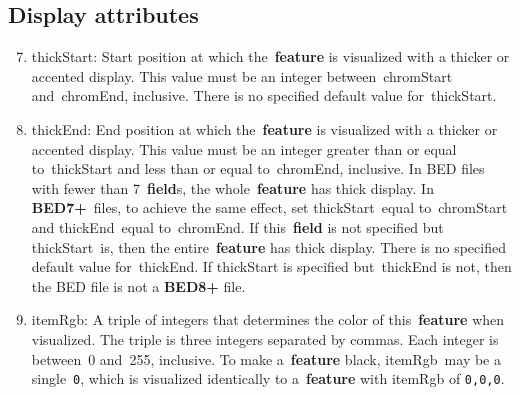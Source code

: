 \documentclass[11pt]{article}
\begin{document}
\subsection{Display attributes}
\begin{enumerate}
  \setcounter{enumi}{6}

\item \textsf{thickStart}: Start position at which the~\textbf{feature} is visualized with a thicker or accented display.
  This value must be an integer between~\textsf{chromStart} and~\textsf{chromEnd}, inclusive.
  There is no specified default value for~\textsf{thickStart}.

\item \textsf{thickEnd}: End position at which the~\textbf{feature} is visualized with a thicker or accented display.
  This value must be an integer greater than or equal to~\textsf{thickStart} and less than or equal to~\textsf{chromEnd}, inclusive.
  In \ac{BED} files with fewer than 7~\textbf{field}s, the whole~\textbf{feature} has thick display.
  In \textbf{BED7+}~files, to achieve the same effect, set \textsf{thickStart}~equal to~\textsf{chromStart} and \textsf{thickEnd}~equal to~\textsf{chromEnd}.
  If this~\textbf{field} is not specified but \textsf{thickStart}~is, then the entire~\textbf{feature} has thick display.
  There is no specified default value for~\textsf{thickEnd}.
  If \textsf{thickStart} is specified but~\textsf{thickEnd} is not, then the \ac{BED} file is not a \textbf{BED8+} file.

\item \textsf{itemRgb}: A triple of integers that determines the color of this~\textbf{feature} when visualized.
  The triple is three integers separated by commas.
  Each integer is between~0 and~255, inclusive.
  To make a~\textbf{feature} black, \textsf{itemRgb}~may be a single~\texttt{0}, which is visualized identically to a~\textbf{feature} with \textsf{itemRgb} of \texttt{0,0,0}.
\end{enumerate}
\end{document}
